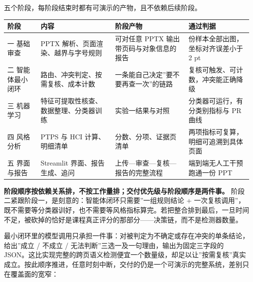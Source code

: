 \documentclass[
  11pt,
]{article}
\newcounter{none} %
\begin{document}
五个阶段，每阶段结束时都有可演示的产物，且不依赖后续阶段。

{\def\LTcaptype{none} %
\begin{longtable}[]{@{}
  >{\raggedright\arraybackslash}p{}
  >{\raggedright\arraybackslash}p{}
  >{\raggedright\arraybackslash}p{}
  >{\raggedright\arraybackslash}p{}@{}}
\toprule\noalign{}
\begin{minipage}[b]{\linewidth}\raggedright
阶段
\end{minipage} & \begin{minipage}[b]{\linewidth}\raggedright
内容
\end{minipage} & \begin{minipage}[b]{\linewidth}\raggedright
阶段产物
\end{minipage} & \begin{minipage}[b]{\linewidth}\raggedright
通过判据
\end{minipage} \\
\midrule\noalign{}
\endhead
\bottomrule\noalign{}
\endlastfoot
一 基础审查 & PPTX 解析、页面渲染、越界与字号规则 & 可对任意 PPTX
输出带页码与对象信息的报告 & 5 份样本全部出图，坐标对齐误差小于 2 pt \\
二 智能体最小闭环 & 路由、冲突判定、按需复核、成本计数 &
一条能自己决定''要不要再查一次''的链路 &
复核可触发、可计数，冲突能正确降级 \\
三 机器学习 & 特征可提取性核查、数据整理、分类器训练 & 实验一结果与对照
& 分类器可运行，有分类别指标与 PR 曲线 \\
四 风格分析 & PTPS 与 HCI 计算、明细清单 & 分数、分项、证据页清单 &
两项指标可复算，明细可追溯到具体页面 \\
五 界面与报告 & Streamlit 界面、报告生成、追问 &
上传---审查---复核---报告的完整流程 & 端到端无人工干预跑通一份 PPT \\
\end{longtable}
}

\textbf{阶段顺序按依赖关系排，不按工作量排；交付优先级与阶段顺序是两件事。}
阶段二紧跟阶段一，是刻意的：智能体闭环只需要''一组规则结论 +
一次复核调用''，既不需要等分类器训好，也不需要等风格指标算完。若把整合排到最后，一旦时间不足，被砍掉的恰好是课程真正评分的那部分------决策链，而不是检测器数量。

最小闭环里的模型调用只承担一件事：对被判定为不确定或存在冲突的单条结论，给出''成立
/ 不成立 / 无法判断''三选一及一句理由，输出为固定三字段的
JSON。这比实现完整的跨页语义检测便宜一个数量级，却足以让''按需复核''真实成立。按此顺序推进，任意时刻中断，交付的仍是一个可演示的完整系统，差别只在覆盖面的宽窄：
\end{document}
